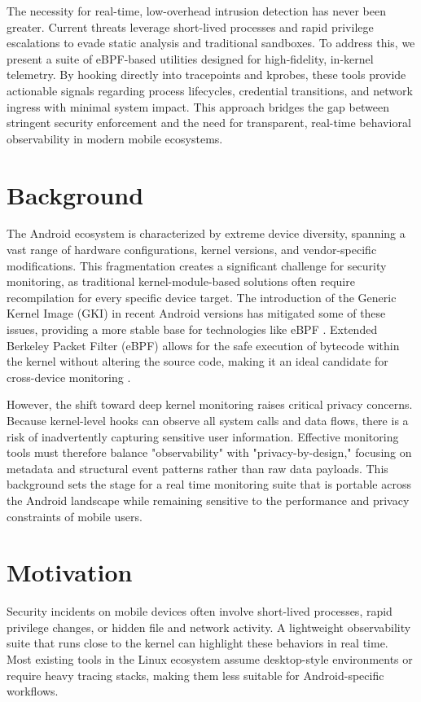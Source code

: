 \documentclass{mnitjaipur}
\begin{document}
The necessity for real-time, low-overhead intrusion detection has never been greater. Current threats leverage short-lived processes and rapid privilege escalations to evade static analysis and traditional sandboxes. To address this, we present a suite of eBPF-based utilities designed for high-fidelity, in-kernel telemetry. By hooking directly into tracepoints and kprobes, these tools provide actionable signals regarding process lifecycles, credential transitions, and network ingress with minimal system impact. This approach bridges the gap between stringent security enforcement and the need for transparent, real-time behavioral observability in modern mobile ecosystems\cite{ebpf_linux_doc,libbpf_doc}.

\section{Background}
The Android ecosystem is characterized by extreme device diversity, spanning a vast range of hardware configurations, kernel versions, and vendor-specific modifications. This fragmentation creates a significant challenge for security monitoring, as traditional kernel-module-based solutions often require recompilation for every specific device target. The introduction of the Generic Kernel Image (GKI) in recent Android versions has mitigated some of these issues, providing a more stable base for technologies like eBPF \cite{gki2023aosp}. Extended Berkeley Packet Filter (eBPF) allows for the safe execution of bytecode within the kernel without altering the source code, making it an ideal candidate for cross-device monitoring \cite{ebpfio2024}.

However, the shift toward deep kernel monitoring raises critical privacy concerns. Because kernel-level hooks can observe all system calls and data flows, there is a risk of inadvertently capturing sensitive user information. Effective monitoring tools must therefore balance "observability" with "privacy-by-design," focusing on metadata and structural event patterns rather than raw data payloads. This background sets the stage for a real time monitoring suite that is portable across the Android landscape while remaining sensitive to the performance and privacy constraints of mobile users.


\section{Motivation}
Security incidents on mobile devices often involve short-lived processes, rapid privilege changes, or hidden file and network activity. A lightweight observability suite that runs close to the kernel can highlight these behaviors in real time. Most existing tools in the Linux ecosystem assume desktop-style environments or require heavy tracing stacks, making them less suitable for Android-specific workflows.
\end{document}
